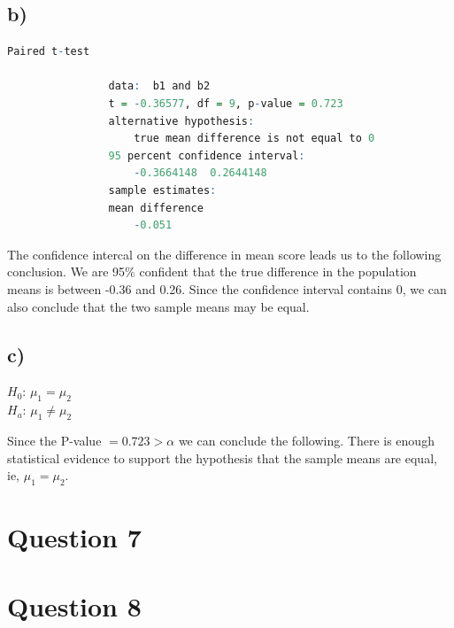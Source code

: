 \documentclass{article}
\begin{document}
\subsection*{b)}

\begin{lstlisting}[language=R, caption=R output of a paired t test, basicstyle=\small]
                Paired t-test

                data:  b1 and b2
                t = -0.36577, df = 9, p-value = 0.723
                alternative hypothesis:
                    true mean difference is not equal to 0
                95 percent confidence interval:
                    -0.3664148  0.2644148
                sample estimates:
                mean difference 
                    -0.051 
\end{lstlisting}

The confidence intercal on the difference in mean score leads us to the following conclusion.
We are 95\% confident that the true difference in the population means is between -0.36 and 0.26.
Since the confidence interval contains 0, we can also conclude that the two sample means may be equal.

\subsection*{c)}

\begin{flushleft}
  $H_0$: $\mu_1 = \mu_2$ \\
  $H_a$: $\mu_1 \neq \mu_2$ \\
\end{flushleft}

Since the P-value $= 0.723 > \alpha$ we can conclude the following.
There is enough statistical evidence to support the hypothesis that the sample means are equal,
ie, $\mu_1 = \mu_2$.


\section*{Question 7}

\section*{Question 8}
\end{document}
